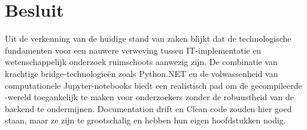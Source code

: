 


\section{Besluit}
Uit de verkenning van de huidige stand van zaken blijkt dat de technologische fundamenten voor een nauwere verweving tussen IT-implementatie en wetenschappelijk onderzoek ruimschoots aanwezig zijn. De combinatie van krachtige bridge-technologieën zoals Python.NET en de volwassenheid van computationele Jupyter-notebooks biedt een realistisch pad om de gecompileerde -wereld toegankelijk te maken voor onderzoekers zonder de robuustheid van de backend te ondermijnen.
Documentation drift en Clean code zouden hier goed staan, maar ze zijn te grootschalig en hebben hun eigen hoofdstukken nodig.









